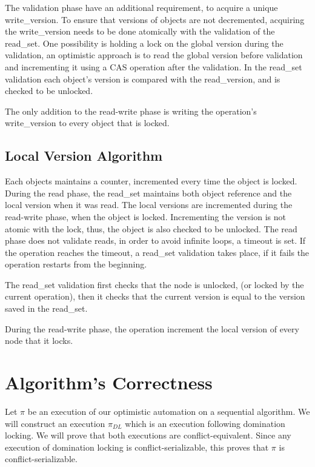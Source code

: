 \documentclass{article}
\newcommand{\code}[1]{\textsf{#1}}
\newcommand{\readV}{\code{read\_version}\xspace}
\newcommand{\readSet}{\code{read\_set}\xspace}
\newcommand{\writeV}{\code{write\_version}\xspace}
\begin{document}
The validation phase have an 
additional  requirement, to acquire a unique \writeV. 
To ensure that versions of objects are not decremented, 
acquiring the \writeV needs to be done atomically with 
the validation of the \readSet. One possibility is holding a
lock on the global version during the validation, 
an optimistic approach is to read the global version 
before validation and incrementing it using a CAS 
operation after the validation. In the \readSet validation 
each object's version is compared with the \readV, 
and is checked to be unlocked. 

The only addition to the read-write phase is writing the 
operation's \writeV to every object that is locked. 


\subsection{Local Version Algorithm} 
Each objects maintains a counter, incremented every time the 
object is locked. During the read phase, the \readSet maintains
both object reference and the local version when it was read.
The local versions are incremented during the read-write phase,
when the object is locked. Incrementing the version is not atomic 
with the lock, thus, the object is also checked to be unlocked. 
The read phase does not validate reads, in order to avoid infinite
loops, a timeout is set. If the operation reaches the timeout, 
a \readSet validation takes place, if it fails the operation
restarts from the beginning. 

The \readSet validation first checks that the node is unlocked,
(or locked by the current operation), then it checks that the 
current version is equal to the version saved in the \readSet. 

During the read-write phase, the operation increment the local 
version of every node that it locks. 
 
\section{Algorithm's Correctness} 
Let $\pi$ be an execution of our optimistic automation on a 
sequential algorithm. We will construct an execution $\pi_{DL}$ 
which is an execution following domination locking. We will prove
that both executions are conflict-equivalent. Since any execution
of domination locking is conflict-serializable, this proves that 
$\pi$ is conflict-serializable. 
\end{document}
